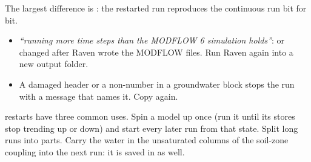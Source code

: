 \begin{tocheck}
The largest difference is : the restarted run reproduces the continuous run bit for bit.
\end{tocheck}
\begin{trouble}
\begin{itemize}
\item \emph{``running more time steps than the MODFLOW 6 simulation holds''}:  or 
  changed after Raven wrote the MODFLOW files. Run Raven again into a new output folder.
\item A damaged  header or a non-number in a groundwater block stops the run with a message that names it.
  Copy  again.
\end{itemize}
\end{trouble}
\why restarts have three common uses. Spin a model up once (run it until its stores stop trending up or down) and start every later run from that state. Split long runs
into parts. Carry the water in the unsaturated columns of the soil-zone coupling into the next run: it is saved in
 as well.
